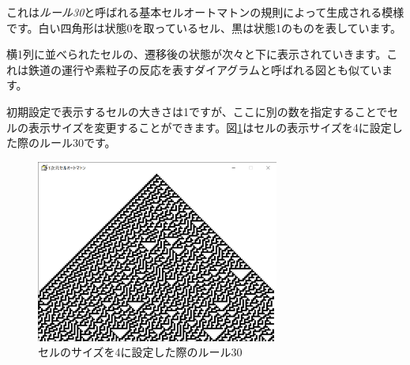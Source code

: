\documentclass{jsarticle}
\begin{document}
これは\emph{ルール30}と呼ばれる基本セルオートマトンの規則によって生成される模様です。白い四角形は状態0を取っているセル、黒は状態1のものを表しています。

横1列に並べられたセルの、遷移後の状態が次々と下に表示されていきます。これは鉄道の運行や素粒子の反応を表すダイアグラムと呼ばれる図とも似ています。

初期設定で表示するセルの大きさは1ですが、ここに別の数を指定することでセルの表示サイズを変更することができます。図\ref{fig:rule30_4px}はセルの表示サイズを4に設定した際のルール30です。

\begin{figure}[hbtp]
    \label{fig:rule30_4px}
    \centering
    \includegraphics[width=8cm]{rule30_4.png}
    \caption{セルのサイズを4に設定した際のルール30}
\end{figure}
\end{document}
